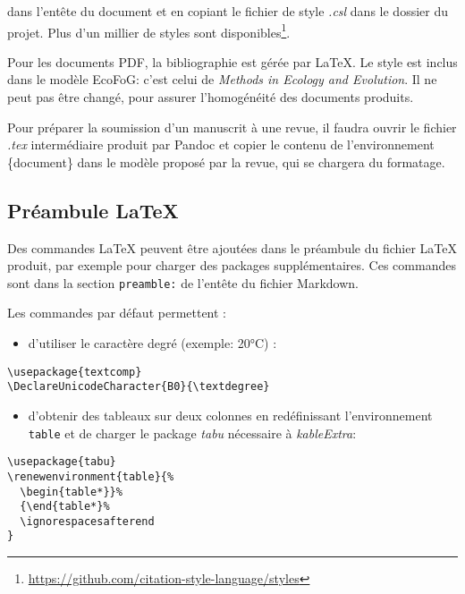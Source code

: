 \documentclass[fleqn,10pt]{latex/stylish_article} %
\providecommand{\tightlist}{%
  \setlength{\itemsep}{0pt}\setlength{\parskip}{0pt}}
\begin{document}
dans l'entête du document et en copiant le fichier de style \emph{.csl} dans le dossier du projet.
Plus d'un millier de styles sont disponibles\footnote{\url{https://github.com/citation-style-language/styles}}.

Pour les documents PDF, la bibliographie est gérée par LaTeX.
Le style est inclus dans le modèle EcoFoG: c'est celui de \emph{Methods in Ecology and Evolution}.
Il ne peut pas être changé, pour assurer l'homogénéité des documents produits.

Pour préparer la soumission d'un manuscrit à une revue, il faudra ouvrir le fichier \emph{.tex} intermédiaire produit par Pandoc et copier le contenu de l'environnement \{document\} dans le modèle proposé par la revue, qui se chargera du formatage.

\hypertarget{pruxe9ambule-latex}{%
\subsection{Préambule LaTeX}\label{pruxe9ambule-latex}}

Des commandes LaTeX peuvent être ajoutées dans le préambule du fichier LaTeX produit, par exemple pour charger des packages supplémentaires.
Ces commandes sont dans la section \texttt{preamble:} de l'entête du fichier Markdown.

Les commandes par défaut permettent :

\begin{itemize}
\tightlist
\item
  d'utiliser le caractère degré (exemple: 20°C) :
\end{itemize}

\begin{verbatim}
\usepackage{textcomp}
\DeclareUnicodeCharacter{B0}{\textdegree}
\end{verbatim}

\begin{itemize}
\tightlist
\item
  d'obtenir des tableaux sur deux colonnes en redéfinissant l'environnement \texttt{table} et de charger le package \emph{tabu} nécessaire à \emph{kableExtra}:
\end{itemize}

\begin{verbatim}
\usepackage{tabu}
\renewenvironment{table}{%
  \begin{table*}}%
  {\end{table*}%
  \ignorespacesafterend
}
\end{verbatim}
\end{document}
